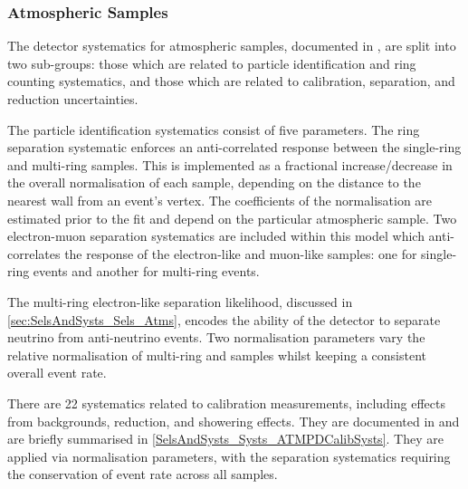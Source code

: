 \subsubsection{Atmospheric Samples}
\label{sec:SelsAndSysts_Systs_FDAtm}

The detector systematics for atmospheric samples, documented in \cite{Jiang2019-iw}, are split into two sub-groups: those which are related to particle identification and ring counting systematics, and those which are related to calibration, separation, and reduction uncertainties.

The particle identification systematics consist of five parameters. The ring separation systematic enforces an anti-correlated response between the single-ring and multi-ring samples. This is implemented as a fractional increase/decrease in the overall normalisation of each sample, depending on the distance to the nearest wall from an event's vertex. The coefficients of the normalisation are estimated prior to the fit and depend on the particular atmospheric sample. Two electron-muon separation systematics are included within this model which anti-correlates the response of the electron-like and muon-like samples: one for single-ring events and another for multi-ring events.

The multi-ring electron-like separation likelihood, discussed in \autoref{sec:SelsAndSysts_Sels_Atms}, encodes the ability of the detector to separate neutrino from anti-neutrino events. Two normalisation parameters vary the relative normalisation of multi-ring  and  samples whilst keeping a consistent overall event rate.

There are 22 systematics related to calibration measurements, including effects from backgrounds, reduction, and showering effects. They are documented in \cite{Jiang2019-iw} and are briefly summarised in \autoref{SelsAndSysts_Systs_ATMPDCalibSysts}. They are applied via normalisation parameters, with the separation systematics requiring the conservation of event rate across all samples.

